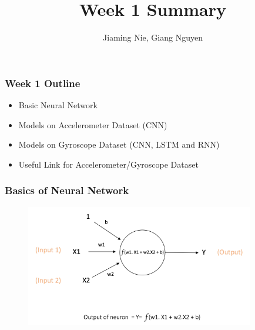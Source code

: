 \documentclass{beamer} %
\author{Jiaming Nie, Giang Nguyen}
\title{Week 1 Summary}
\begin{document}




\begin{frame}
\frametitle{Week 1 Outline}

\begin{itemize}
\item Basic Neural Network
\item Models on Accelerometer Dataset (CNN)
\item Models on Gyroscope Dataset (CNN, LSTM and RNN)
\item Useful Link for Accelerometer/Gyroscope Dataset 
\end{itemize}



\end{frame}
\begin{frame}
\frametitle{Basics of Neural Network}
\begin{figure}[htbp] 
	
	\begin{center}
		\includegraphics[width=10cm]{./image/single-neuron} 
		\label{fig:neuron}		
	\end{center}

\end{figure}

\end{frame}
\end{document}
